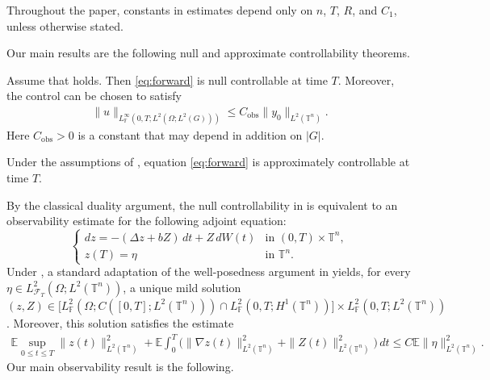 \documentclass[print,wide]{draft}
\begin{document}
Throughout the paper, constants in estimates depend only on $n$, $T$, $R$,
and $C_1$, unless otherwise stated.   




Our main results are the following null and approximate controllability
theorems.

\begin{theorem}
\label{thm:null-controllability}
Assume that  holds. Then \eqref{eq:forward} is null controllable at time \(T\). Moreover, the control can be chosen to satisfy
\begin{align}\label{eq:control-cost}
\lVert u\rVert_{L^\infty_{\mathbb F}(0,T;L^2(\Omega;L^2(G)))}
\leq C_{\mathrm{obs}}\lVert y_0\rVert_{L^2(\mathbb T^n)}.
\end{align}
Here \(C_{\mathrm{obs}}>0\) is a constant that may depend in addition on \(|G|\).
\end{theorem}

\begin{theorem} 
\label{thm:approximate-controllability}
Under the assumptions of , equation
\eqref{eq:forward} is approximately controllable at time $T$.
\end{theorem}


By the classical duality argument, the null controllability in  is equivalent to an observability estimate for the following adjoint equation:
\begin{equation}\label{eq:backward}
\begin{cases}
d z=-(\Delta z+bZ)\,d t+Z\,d W(t)
&\text{in }(0,T)\times\mathbb{T}^n, \\[2pt]
z(T)=\eta
&\text{in }\mathbb{T}^n. 
\end{cases}
\end{equation}
Under , a standard adaptation of the well-posedness argument in \cite[Section~4.4]{Lue2021a} yields, for every $\eta\in L^2_{\mathcal{F}_T}(\Omega;L^2(\mathbb{T}^n))$, a unique mild solution  
$(z,Z) \in \big[L^2_{\mathbb F}(\Omega;C([0,T];L^2(\mathbb{T}^n)))
\cap L^2_{\mathbb F}(0,T;H^1(\mathbb{T}^n))\big]\times L^2_{\mathbb F}(0,T;L^2(\mathbb{T}^n))$. 
Moreover, this solution satisfies the estimate
\begin{align}\label{eq:backward-solution-estimate}
\mathbb{E}\sup_{0\leq t\leq T}\|z(t)\|_{L^2(\mathbb{T}^n)}^2
+\mathbb{E}\int_0^T\bigl(\|\nabla z(t)\|_{L^2(\mathbb{T}^n)}^2+\|Z(t)\|_{L^2(\mathbb{T}^n)}^2\bigr)\,d t
\leq C\mathbb{E}\|\eta\|_{L^2(\mathbb{T}^n)}^2.
\end{align}
Our main observability result is the following.
\end{document}
